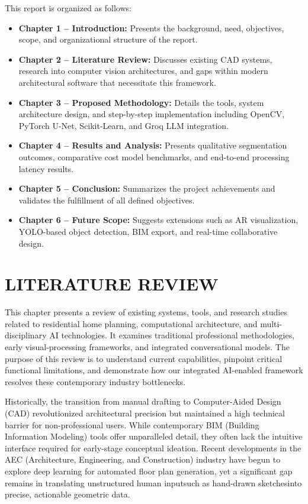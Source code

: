\documentclass[12pt]{report}
\begin{document}
This report is organized as follows:

\begin{itemize}
  \item \textbf{Chapter 1 -- Introduction:} Presents the background, need, objectives, scope, and organizational structure of the report.
  \item \textbf{Chapter 2 -- Literature Review:} Discusses existing CAD systems, research into computer vision architectures, and gaps within modern architectural software that necessitate this framework.
  \item \textbf{Chapter 3 -- Proposed Methodology:} Details the tools, system architecture design, and step-by-step implementation including OpenCV, PyTorch U-Net, Scikit-Learn, and Groq LLM integration.
  \item \textbf{Chapter 4 -- Results and Analysis:} Presents qualitative segmentation outcomes, comparative cost model benchmarks, and end-to-end processing latency results.
  \item \textbf{Chapter 5 -- Conclusion:} Summarizes the project achievements and validates the fulfillment of all defined objectives.
  \item \textbf{Chapter 6 -- Future Scope:} Suggests extensions such as AR visualization, YOLO-based object detection, BIM export, and real-time collaborative design.
\end{itemize}

\chapter{LITERATURE REVIEW}

This chapter presents a review of existing systems, tools, and research studies related to residential home planning, computational architecture, and multi-disciplinary AI technologies. It examines traditional professional methodologies, early visual-processing frameworks, and integrated conversational models. The purpose of this review is to understand current capabilities, pinpoint critical functional limitations, and demonstrate how our integrated AI-enabled framework resolves these contemporary industry bottlenecks. 

Historically, the transition from manual drafting to Computer-Aided Design (CAD) revolutionized architectural precision but maintained a high technical barrier for non-professional users. While contemporary BIM (Building Information Modeling) tools offer unparalleled detail, they often lack the intuitive interface required for early-stage conceptual ideation\cite{opencv2024, canny1986}. Recent developments in the AEC (Architecture, Engineering, and Construction) industry have begun to explore deep learning for automated floor plan generation, yet a significant gap remains in translating unstructured human input\—such as hand-drawn sketches\—into precise, actionable geometric data. 
\end{document}

